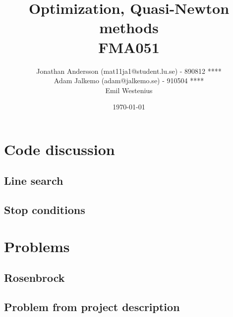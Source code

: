 \documentclass{article}
\begin{document}
\title{Optimization, Quasi-Newton methods\\  FMA051} %

\author{Jonathan Andersson (mat11ja1@student.lu.se) - 890812 **** \\ Adam Jalkemo (adam@jalkemo.se) - 910504 **** \\ Emil Westenius} %

\date{\today} %


\maketitle %
\pagebreak


\section{Code discussion}
\subsection{Line search}

\subsection{Stop conditions}




\section{Problems}
\subsection{Rosenbrock}

\subsection{Problem from project description}

\end{document}
